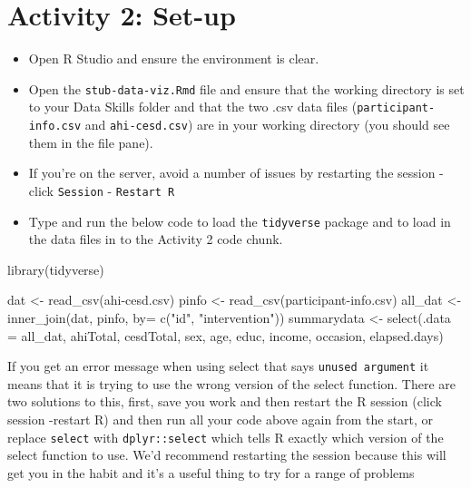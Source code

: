\documentclass[
  oneside]{book}
\newenvironment{Shaded}{\begin{snugshade}}{\end{snugshade}}
\newcommand{\AttributeTok}[1]{\textcolor[rgb]{0.77,0.63,0.00}{#1}}
\newcommand{\FunctionTok}[1]{\textcolor[rgb]{0.00,0.00,0.00}{#1}}
\newcommand{\NormalTok}[1]{#1}
\newcommand{\OtherTok}[1]{\textcolor[rgb]{0.56,0.35,0.01}{#1}}
\newcommand{\StringTok}[1]{\textcolor[rgb]{0.31,0.60,0.02}{#1}}
\providecommand{\tightlist}{%
  \setlength{\itemsep}{0pt}\setlength{\parskip}{0pt}}
\begin{document}
\hypertarget{activity-2-set-up}{%
\section{Activity 2: Set-up}\label{activity-2-set-up}}

\begin{itemize}
\tightlist
\item
  Open R Studio and ensure the environment is clear.\\
\item
  Open the \texttt{stub-data-viz.Rmd} file and ensure that the working directory is set to your Data Skills folder and that the two .csv data files (\texttt{participant-info.csv} and \texttt{ahi-cesd.csv}) are in your working directory (you should see them in the file pane).\\
\item
  If you're on the server, avoid a number of issues by restarting the session - click \texttt{Session} - \texttt{Restart\ R}\\
\item
  Type and run the below code to load the \texttt{tidyverse} package and to load in the data files in to the Activity 2 code chunk.
\end{itemize}

\begin{Shaded}
\begin{Highlighting}[]
\FunctionTok{library}\NormalTok{(tidyverse) }

\NormalTok{dat }\OtherTok{\textless{}{-}} \FunctionTok{read\_csv}\NormalTok{(}\StringTok{\textquotesingle{}ahi{-}cesd.csv\textquotesingle{}}\NormalTok{)}
\NormalTok{pinfo }\OtherTok{\textless{}{-}} \FunctionTok{read\_csv}\NormalTok{(}\StringTok{\textquotesingle{}participant{-}info.csv\textquotesingle{}}\NormalTok{)}
\NormalTok{all\_dat }\OtherTok{\textless{}{-}} \FunctionTok{inner\_join}\NormalTok{(dat, pinfo, }\AttributeTok{by=} \FunctionTok{c}\NormalTok{(}\StringTok{"id"}\NormalTok{, }\StringTok{"intervention"}\NormalTok{))}
\NormalTok{summarydata }\OtherTok{\textless{}{-}} \FunctionTok{select}\NormalTok{(}\AttributeTok{.data =}\NormalTok{ all\_dat, }
\NormalTok{                      ahiTotal, cesdTotal, sex, age, }
\NormalTok{                      educ, income, occasion, elapsed.days) }
\end{Highlighting}
\end{Shaded}

\begin{danger}
If you get an error message when using select that says
\texttt{unused\ argument} it means that it is trying to use the wrong
version of the select function. There are two solutions to this, first,
save you work and then restart the R session (click session -restart R)
and then run all your code above again from the start, or replace
\texttt{select} with \texttt{dplyr::select} which tells R exactly which
version of the select function to use. We'd recommend restarting the
session because this will get you in the habit and it's a useful thing
to try for a range of problems
\end{danger}
\end{document}
